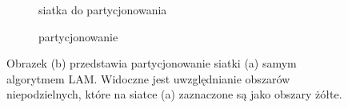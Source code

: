 \begin{figure}[h]
\centering
\begin{subfigure}{.5\textwidth}
    \centering
    \caption[short]{siatka do partycjonowania}
\end{subfigure}%
\begin{subfigure}{.5\textwidth}
    \centering
    \caption[short]{partycjonowanie}
\end{subfigure}
\caption{Obrazek (b) przedstawia partycjonowanie siatki (a) samym algorytmem LAM. Widoczne jest uwzględnianie obszarów
niepodzielnych, które na siatce (a) zaznaczone są jako obszary żółte.}
\label{im:lam_indivisible}
\end{figure}

